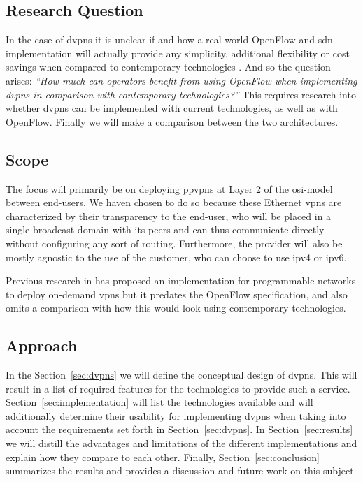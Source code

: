 	\subsection{Research Question} %
	\label{sub:research_question}
	In the case of \acp{dvpn} it is unclear if and how a real-world OpenFlow and \ac{sdn} implementation will actually provide any simplicity, additional flexibility or cost savings when compared to contemporary technologies \cite{programmability-answer}. 
	And so the question arises: \textsl{``How much can operators benefit from using OpenFlow when implementing \aclp{dvpn} in comparison with contemporary technologies?''} 
	This requires research into whether \acp{dvpn} can be implemented with current technologies, as well as with OpenFlow. Finally we will make a comparison between the two architectures.


	\subsection{Scope} %
	\label{sub:scope}
	The focus will primarily be on deploying \acp{ppvpn} at Layer 2 of the \acs{osi}-model between end-users. We haven chosen to do so because these Ethernet \acp{vpn} are characterized by their transparency to the end-user, who will be placed in a single broadcast domain with its peers and can thus communicate directly without configuring any sort of routing. Furthermore, the provider will also be mostly agnostic to the use of the customer, who can choose to use \acs{ip}v4 or \acs{ip}v6.
	
	Previous research in \cite{net-prog-vpn} has proposed an implementation for programmable networks to deploy on-demand \acp{vpn} but it predates the OpenFlow specification, and also omits a comparison with how this would look using contemporary technologies. 


	\subsection{Approach} %
	\label{sub:approach}
	In the Section~\ref{sec:dvpns} we will define the conceptual design of \acp{dvpn}. This will result in a list of required features for the technologies to provide such a service. Section~\ref{sec:implementation} will list the technologies available and will additionally determine their usability for implementing \acp{dvpn} when taking into account the requirements set forth in Section~\ref{sec:dvpns}. In Section~\ref{sec:results} we will distill the advantages and limitations of the different implementations and explain how they compare to each other. Finally, Section~\ref{sec:conclusion} summarizes the results and provides a discussion and future work on this subject.


